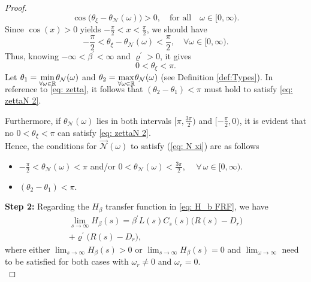 \begin{proof}
\begin{equation}
    \label{eq: N xi 3}
    \cos{\Big(\theta_{\xi}-\theta_{\mathcal{N}}(\omega)\Big)}>0, \quad \text{for all}\quad \omega \in [0,\infty).
\end{equation}
Since $\cos{(x)}>0$ yields $-\frac{\pi}{2}<x<\frac{\pi}{2}$, we should have
\begin{equation}
   -\frac{\pi}{2}<\theta_{\xi}-\theta_{\mathcal{N}}(\omega)<\frac{\pi}{2}, \quad \forall \omega \in [0,\infty).
   \label{eq: zettaN 2}
\end{equation}
Thus, knowing $-\infty<\beta^{'}<\infty$ and $\varrho^{'}>0$, it gives
\begin{equation}
    0<\theta_{\xi}<\pi.
    \label{eq: zetta}
\end{equation}
Let $\theta_1 = \smash{\displaystyle\min_{\forall \omega \in \mathbb{R}}} \theta_{\mathcal{N}}(\omega)$ and $\theta_2 = \smash{\displaystyle\max_{\forall \omega \in \mathbb{R}}} \theta_{\mathcal{N}}(\omega)$ (see Definition \ref{def:Types}). In reference to \eqref{eq: zetta}, it follows that $(\theta_2 - \theta_1) < \pi$ must hold to satisfy \eqref{eq: zettaN 2}.

Furthermore, if $\theta_{\mathcal{N}}(\omega)$ lies in both intervals $[\pi, \frac{3\pi}{2})$ and $[-\frac{\pi}{2}, 0)$, it is evident that no $0 < \theta_{\xi} < \pi$ can satisfy \eqref{eq: zettaN 2}.
\\

Hence, the conditions for $\overrightarrow{\mathcal{N}}(\omega)$ to satisfy (\ref{eq: N xi}) are as follows
\begin{itemize}
    \item $-\frac{\pi}{2}<\theta_{\mathcal{N}}(\omega)<\pi$ and/or $0<\theta_{\mathcal{N}}(\omega)<\frac{3\pi}{2}$, $\quad \forall \, \omega \in [0,\infty)$.
    \item $(\theta_2-\theta_1)<\pi$. \\
\end{itemize}

\textbf{Step 2:} Regarding the $H_\beta$ transfer function in \eqref{eq: H_b FRF}, we have
\begin{equation}
\begin{split}
    \label{ Hb infty}
    \lim_{s \to \infty} H_\beta(s)=\beta^{'}L(s)C_s(s)\big(R(s)-D_r\big)\\+\varrho^{'}\big(R(s)-D_r\big),
    \end{split}
\end{equation}
where either $\lim_{s \to \infty}H_\beta (s) >0$ or $\lim_{s \to \infty}H_\beta (s) =0$ and $\lim_{\omega \to \infty}$ need to be satisfied for both cases with $\omega_r\neq 0$ and $\omega_r=0$.\\


\end{proof}
